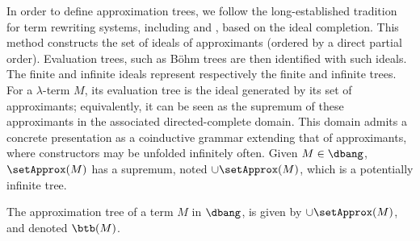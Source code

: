 In order to define approximation trees, we follow the long-established tradition for term
rewriting systems, including \cbn{} and \cbv{} \cite{Ariola70, Boudol83,Barendregt84,
Amadio98, Ariola02, kerinec:bohmTreeCbV}, based on the ideal completion. 
This method constructs the set of ideals of approximants (ordered by a
direct partial order). Evaluation trees, such as Böhm trees are then identified with such ideals.
The finite and infinite ideals represent respectively the finite and
infinite trees. For a $\lambda$-term $M$, its evaluation tree is the ideal
generated by its set of approximants; equivalently, it can be seen as
the supremum of these approximants in the associated directed-complete
domain.
This domain admits a concrete presentation as a coinductive grammar extending
that of approximants, where constructors may be unfolded infinitely often.
%
Given $M \in \dbang$, $\setApprox(M)$ has a supremum, noted $\cup\setApprox(M)$,
which is a potentially infinite tree.
\begin{definition}
	The approximation tree of a term $M$ in $\dbang$, is given by
	$\cup\setApprox(M)$, and denoted $\btb(M)$.
\end{definition}


